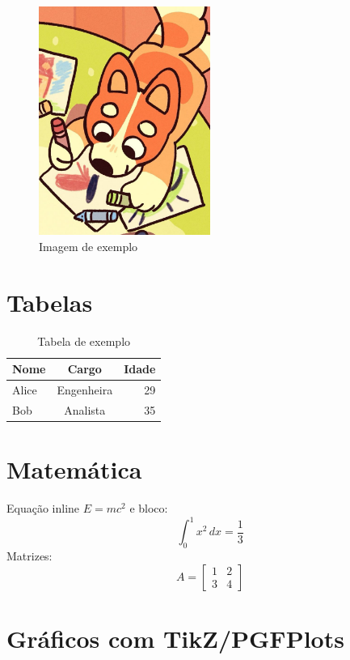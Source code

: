 \documentclass[12pt]{article}
\begin{document}
\begin{figure}[h!]
\centering
\includegraphics[width=0.5\textwidth]{figures/default.jpg}
\caption{Imagem de exemplo}\label{fig:exemplo}
\end{figure}

\section{Tabelas}
\begin{table}[h!]
\centering
\begin{tabular}{lcr}
\toprule
\textbf{Nome} & \textbf{Cargo} & \textbf{Idade} \\
\midrule
Alice & Engenheira & 29 \\
Bob   & Analista   & 35 \\
\bottomrule
\end{tabular}
\caption{Tabela de exemplo}\label{tab:exemplo}
\end{table}

\section{Matemática}\label{sec:matematica}
Equação inline $E = mc^2$ e bloco:
\[
\int_{0}^{1} x^2 \, dx = \frac{1}{3}
\]
Matrizes:
\[
A = \begin{bmatrix}
1 & 2 \\
3 & 4
\end{bmatrix}
\]

\section{Gráficos com TikZ/PGFPlots}
\end{document}
